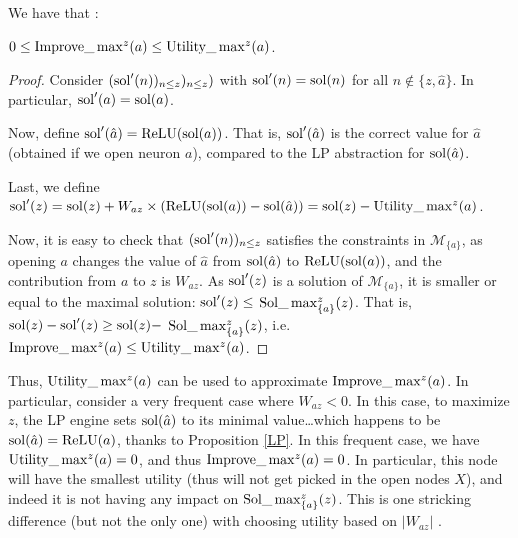We have that :

\begin{proposition}
$0 \leq \mathrm{Improve}\_\max^z(a) \leq \mathrm{Utility}\_\max^z(a)$. 
\end{proposition}

\begin{proof}
Consider $(\mathrm{sol}'(n))_{n \leq z})_{n \leq z})$ with
$\mathrm{sol}'(n)=\mathrm{sol}(n)$ for all $n \notin \{z,\hat{a}\}$.
In particular,  $\mathrm{sol}'(a) = \mathrm{sol}(a)$.

Now, define $\mathrm{sol}'(\hat{a}) = \mathrm{ReLU}(\mathrm{sol}(a))$. 
That is,  
$\mathrm{sol}'(\hat{a})$ is the correct value for $\hat{a}$ (obtained if we open neuron $a$), 
compared to the LP abstraction for $\mathrm{sol}(\hat{a})$.

Last, we define $\mathrm{sol}'(z)=\mathrm{sol}(z) + W_{az} \times (\mathrm{ReLU}(\mathrm{sol}(a)) - \mathrm{sol}(\hat{a})) = \mathrm{sol}(z) - \mathrm{Utility}\_\max^z(a)$.

Now, it is easy to check that $(\mathrm{sol}'(n))_{n \leq z}$ satisfies the constraints in 
$\mathcal{M}_{\{a\}}$, as opening $a$ changes the value of $\hat{a}$ from
$\mathrm{sol}(\hat{a})$ to $\mathrm{ReLU}(\mathrm{sol}(a))$, and the contribution from $a$ to $z$ is 
$W_{az}$. As $\mathrm{sol}'(z)$ is a solution of $\mathcal{M}_{\{a\}}$, it is smaller or equal to the maximal solution: $\mathrm{sol}'(z) \leq$ $\mathrm{Sol}\_\max_{\{a\}}^z(z)$. That is, 
$\mathrm{sol}(z)-\mathrm{sol}'(z) \geq \mathrm{sol}(z) -$ $\mathrm{Sol}\_\max_{\{a\}}^z(z)$, i.e. 
$\mathrm{Improve}\_\max^z(a) \leq \mathrm{Utility}\_\max^z(a)$.
\end{proof}

Thus, $\mathrm{Utility}\_\max^z(a)$ can be used to approximate 
$\mathrm{Improve}\_\max^z(a)$. In particular, consider a very frequent case where $W_{az}<0$.
In this case, to maximize $z$, the LP engine sets $\mathrm{sol}(\hat{a})$ to its minimal value\dots which happens to be $\mathrm{sol}(\hat{a})=\mathrm{ReLU}(a)$, thanks to Proposition \ref{LP}. 
In this frequent case, we have $\mathrm{Utility}\_\max^z(a)=0$, and thus $\mathrm{Improve}\_\max^z(a)=0$. 
In particular, this node will have the smallest utility (thus will not get picked in the open nodes $X$), and indeed it is not having any impact on  $\mathrm{Sol}\_\max_{\{a\}}^z(z)$. 
This is one stricking difference (but not the only one) with choosing utility based on 
$|W_{az}|$ \cite{DivideAndSlide}.

	
%	
	
